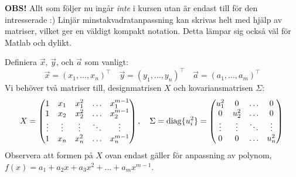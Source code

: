 \documentclass[9pt]{beamer}
\begin{document}
    \begin{frame}
        \textbf{OBS!} Allt som följer nu ingår \emph{inte} i kursen utan är endast till för den intresserade :)
        \vfill
        Linjär minstakvadratanpassning kan skrivas helt med hjälp av matriser, vilket ger en väldigt kompakt notation. Detta lämpar sig också väl för Matlab och dylikt.
        \vfill

        Definiera $\vec x$, $\vec y$, och $\vec a$ som vanligt:
        \begin{equation*}
            \vec x = (x_1, \ldots, x_n)^\top\quad \vec y = (y_1, \ldots, y_n)^\top \quad \vec a = (a_1,\ldots,a_m)^\top
        \end{equation*}
        Vi behöver två matriser till, designmatrisen $X$ och kovariansmatrisen $\Sigma$:
        \begin{equation*}
            X = \begin{pmatrix}
                1      & x_1    & x_1^2    & \ldots & x_1^{m-1} \\
                1      & x_2    & x_2^2    & \ldots & x_2^{m-1} \\
                \vdots & \vdots & \vdots   & \ddots & \vdots    \\
                1      & x_n    & x_n^2    & \ldots & x_n^{m-1} \\
            \end{pmatrix},\quad
            \Sigma = \mathrm{diag}\{u_i^2\} = \begin{pmatrix}
                u_1^2 & 0 & \ldots & 0 \\
                0 & u_2^2 & \ldots & 0 \\
                \vdots & \vdots & \ddots & \vdots \\
                0 & 0 & \ldots & u_n^2 \\
            \end{pmatrix}\\
        \end{equation*}
        \vfill
        Observera att formen på $X$ ovan endast gäller för anpassning av polynom, $f(x) = a_1 + a_2x + a_3x^2 + \ldots + a_mx^{m-1}$.
    \end{frame}
\end{document}
